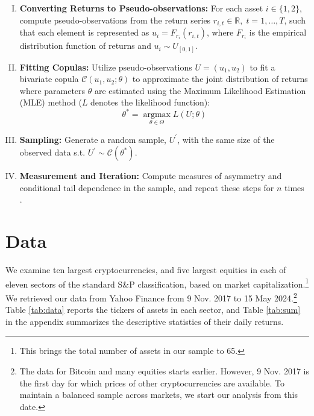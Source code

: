 \documentclass{article}
\DeclareMathOperator*{\argmax}{argmax}
\begin{document}
\begin{enumerate}[I)]
    \item \textbf{Converting Returns to Pseudo-observations:} For each asset $i \in \{1,2\}$, compute pseudo-observations from the return series \( r_{i,t} \in \mathbb{R}, \; t = 1, \dots, T \), such that each element is represented as \( u_i = F_{r_i}(r_{i,t}) \), where \(F_{r_i}\) is the empirical distribution function of returns and $ u_i \sim  U_{[0,1]}$.

    \item \textbf{Fitting Copulas:} Utilize pseudo-observations \( U = (u_1, u_2) \) to fit a bivariate copula \( \mathcal{C}(u_1, u_2; \theta) \) to approximate the joint distribution of returns where parameters \( \theta \) are estimated using the Maximum Likelihood Estimation (MLE) method (\(L\) denotes the likelihood function):
\begin{equation*}
    \theta^* =\argmax\limits_{\theta \in \Theta} L(U; \theta)
\end{equation*}
   

    \item \textbf{Sampling:} Generate a random sample, $U^{'}$, with the same size of the observed data s.t. $ U^{'}  \sim \mathcal{C} (\theta^*) $.

    \item \textbf{Measurement and Iteration:} Compute measures of asymmetry and conditional tail dependence in the sample, and repeat these steps for \(n\) times .

\end{enumerate}


\section{Data}\label{data}
We examine ten largest cryptocurrencies, and five largest equities in each of eleven sectors of the standard S\&P classification, based on market capitalization.\footnote{This brings the total number of assets in our sample to 65.} We retrieved our data from Yahoo Finance from 9 Nov. 2017 to 15 May 2024.\footnote{The data for Bitcoin and many equities starts earlier. However, 9 Nov. 2017 is the first day for which prices of other cryptocurrencies are available. To maintain a balanced sample across markets, we start our analysis from this date.} Table \ref{tab:data} reports the tickers of assets in each sector, and Table \ref{tab:sum} in the appendix summarizes the descriptive statistics of their daily returns. 
\end{document}
